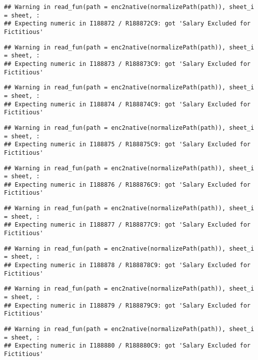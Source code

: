 \documentclass[
]{article}
\begin{document}
\begin{verbatim}
## Warning in read_fun(path = enc2native(normalizePath(path)), sheet_i = sheet, :
## Expecting numeric in I188872 / R188872C9: got 'Salary Excluded for Fictitious'
\end{verbatim}

\begin{verbatim}
## Warning in read_fun(path = enc2native(normalizePath(path)), sheet_i = sheet, :
## Expecting numeric in I188873 / R188873C9: got 'Salary Excluded for Fictitious'
\end{verbatim}

\begin{verbatim}
## Warning in read_fun(path = enc2native(normalizePath(path)), sheet_i = sheet, :
## Expecting numeric in I188874 / R188874C9: got 'Salary Excluded for Fictitious'
\end{verbatim}

\begin{verbatim}
## Warning in read_fun(path = enc2native(normalizePath(path)), sheet_i = sheet, :
## Expecting numeric in I188875 / R188875C9: got 'Salary Excluded for Fictitious'
\end{verbatim}

\begin{verbatim}
## Warning in read_fun(path = enc2native(normalizePath(path)), sheet_i = sheet, :
## Expecting numeric in I188876 / R188876C9: got 'Salary Excluded for Fictitious'
\end{verbatim}

\begin{verbatim}
## Warning in read_fun(path = enc2native(normalizePath(path)), sheet_i = sheet, :
## Expecting numeric in I188877 / R188877C9: got 'Salary Excluded for Fictitious'
\end{verbatim}

\begin{verbatim}
## Warning in read_fun(path = enc2native(normalizePath(path)), sheet_i = sheet, :
## Expecting numeric in I188878 / R188878C9: got 'Salary Excluded for Fictitious'
\end{verbatim}

\begin{verbatim}
## Warning in read_fun(path = enc2native(normalizePath(path)), sheet_i = sheet, :
## Expecting numeric in I188879 / R188879C9: got 'Salary Excluded for Fictitious'
\end{verbatim}

\begin{verbatim}
## Warning in read_fun(path = enc2native(normalizePath(path)), sheet_i = sheet, :
## Expecting numeric in I188880 / R188880C9: got 'Salary Excluded for Fictitious'
\end{verbatim}
\end{document}
